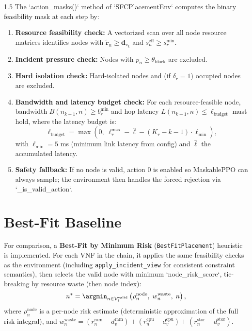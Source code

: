 \documentclass[A4paper,12pt]{report}
\theoremstyle{plain}
\theoremstyle{definition}
\theoremstyle{remark}
\numberwithin{equation}{section}
\begin{document}
\begin{spacing}{1.5}
The `action\_masks()` method of `SFCPlacementEnv` computes the binary feasibility mask at each step by:
\begin{enumerate}
  \item \textbf{Resource feasibility check:} A vectorized scan over all node resource matrices identifies nodes with $\tilde{\mathbf{r}}_n \geq \mathbf{d}_{v_k}$ and $s_n^{\text{eff}} \geq s_r^{\min}$.
  \item \textbf{Incident pressure check:} Nodes with $p_n \geq \theta_{\text{block}}$ are excluded.
  \item \textbf{Hard isolation check:} Hard-isolated nodes and (if $\delta_r = 1$) occupied nodes are excluded.
  \item \textbf{Bandwidth and latency budget check:} For each resource-feasible node, bandwidth $B(n_{k-1}, n) \geq b_r^{\min}$ and hop latency $L(n_{k-1}, n) \leq \ell_{\text{budget}}$ must hold, where the latency budget is:
  \begin{equation}
  \ell_{\text{budget}} = \max\!\left(0,\; \ell_r^{\max} - \hat{\ell} - (K_r - k - 1) \cdot \ell_{\min}\right),
  \end{equation}
  with $\ell_{\min} = 5$ ms (minimum link latency from config) and $\hat{\ell}$ the accumulated latency.
  \item \textbf{Safety fallback:} If no node is valid, action 0 is enabled so MaskablePPO can always sample; the environment then handles the forced rejection via `\_is\_valid\_action`.
\end{enumerate}

\section{Best-Fit Baseline}

For comparison, a \textbf{Best-Fit by Minimum Risk} (\texttt{BestFitPlacement}) heuristic is implemented. For each VNF in the chain, it applies the same feasibility checks as the environment (including \texttt{apply\_incident\_view} for consistent constraint semantics), then selects the valid node with minimum `node\_risk\_score`, tie-breaking by resource waste (then node index):
\begin{equation}
n^* = \argmin_{n \in \mathcal{V}_t^{\text{valid}}} \left(\rho_n^{\text{node}},\; w_n^{\text{waste}},\; n\right),
\end{equation}
where $\rho_n^{\text{node}}$ is a per-node risk estimate (deterministic approximation of the full risk integral), and $w_n^{\text{waste}} = (r_n^{\text{ram}} - d_v^{\text{ram}}) + (r_n^{\text{cpu}} - d_v^{\text{cpu}}) + (r_n^{\text{stor}} - d_v^{\text{stor}})$.


\end{spacing}
\end{document}
